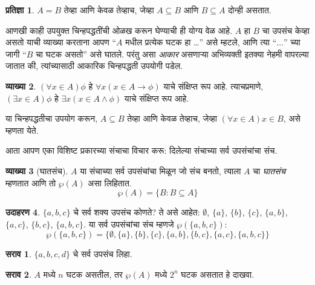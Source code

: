 \documentclass[11pt,a4paper,openany]{book}
\theoremstyle{definition}
\newtheorem{defn}{व्याख्या}[section]
\newtheorem{ex}[defn]{उदाहरण}
\newtheorem{prop}[defn]{प्रतिज्ञा}
\newtheorem{prob}{सराव}[chapter]
\newcommand{\Setabs}[2]{\{#1:#2\}}
\newcommand{\Pow}[1]{\wp(#1)}
\newcommand{\lif}{\mathbin{\to}}
\begin{document}
\begin{prop}
$A = B$ तेव्हा आणि केवळ तेव्हाच, जेव्हा $A \subseteq B$ आणि $B \subseteq A$ दोन्ही असतात.
\end{prop}

आणखी काही उपयुक्त चिन्हपद्धतींची ओळख करून घेण्याची ही योग्य वेळ आहे.
$A$ हा $B$ चा उपसंच केव्हा असतो याची व्याख्या करताना आपण
``$A$ मधील प्रत्येक घटक हा \dots'' असे म्हटले, आणि त्या
``$\dots$'' च्या जागी ``$B$ चा घटक असतो'' असे घातले.
परंतु असा \emph{आकार} असणाऱ्या अभिव्यक्ती इतक्या नेहमी वापरल्या जातात की,
त्यांच्यासाठी आकारिक चिन्हपद्धती उपयोगी पडेल.

\begin{defn}\label{sfr:set:sub:forallxina}
$(\forall x \in A)\phi$ हे $\forall x(x \in A \lif
\phi)$ याचे संक्षिप्त रूप आहे. त्याचप्रमाणे, $(\exists x \in A)\phi$ हे
$\exists x(x
\in A \land \phi)$ याचे संक्षिप्त रूप आहे.
\end{defn}

या चिन्हपद्धतीचा उपयोग करून, $A \subseteq B$ तेव्हा आणि केवळ तेव्हाच, जेव्हा
$(\forall
x \in A)x \in B$, असे म्हणता येते.

आता आपण एका विशिष्ट प्रकारच्या संचाचा विचार करू: दिलेल्या संचाच्या सर्व
उपसंचांचा संच.

\begin{defn}[घातसंच]
$A$ या संचाच्या सर्व उपसंचांचा मिळून जो संच बनतो, त्याला
$A$ चा \emph{घातसंच} म्हणतात आणि तो $\Pow{A}$ असा लिहितात.
  \[
    \Pow{A} = \Setabs{B}{B \subseteq A}
  \]
\end{defn}

\begin{ex}
$\{ a, b, c \}$ चे सर्व शक्य उपसंच कोणते? ते असे आहेत:
$\emptyset$, $\{a \}$, $\{b\}$, $\{c\}$, $\{a, b\}$, $\{a, c\}$, $\{b,
c\}$, $\{a, b, c\}$. या सर्व उपसंचांचा संच म्हणजे
$\Pow{\{a,b,c\}}$:
\[
\Pow{\{ a, b, c \}} = \{\emptyset, \{a \}, \{b\}, \{c\}, \{a, b\},
\{b, c\}, \{a, c\}, \{a, b, c\}\}
\]
\end{ex}

\begin{prob}
$\{a, b, c, d\}$ चे सर्व उपसंच लिहा.
\end{prob}

\begin{prob}
$A$ मध्ये $n$ घटक असतील, तर $\Pow{A}$ मध्ये $2^n$
घटक असतात हे दाखवा.
\end{prob}
\end{document}
